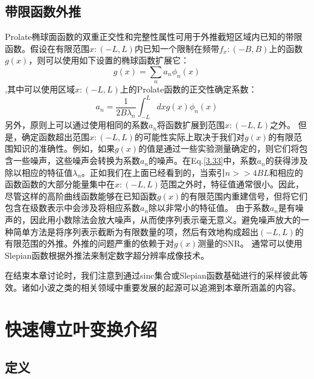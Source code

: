 \documentclass[10pt, UTF8]{ctexart}%
\newcommand{\InsertEqution}[2]{\begin{equation}
  \label{#1}
   #2
 \end{equation}}
\newcommand{\RefEq}[1]{Eq.\ref{#1}}
\newcommand{\InsertInlineEq}[1]{$#1$}
\begin{document}
\begin{sloppypar}
  \subsection{带限函数外推}
  Prolate椭球面函数的双重正交性和完整性属性可用于外推截短区域内已知的带限函数。假设在有限范围\InsertInlineEq{x:(-L,L)}内已知一个限制在频带\InsertInlineEq{f_x:(-B,B)}上的函数\InsertInlineEq{g(x)}，则可以使用如下设置的椭球函数扩展它：\InsertEqution{3.32}{g(x)=\sum_{n} a_{n} \phi_{n}(x)},其中可以使用区域\InsertInlineEq{x:(-L,L)}上的Prolate函数的正交性确定系数：\InsertEqution{3.33}{a_{n}=\frac{1}{2 B \lambda_{n}} \int_{-L}^{L} d x g(x) \phi_{n}(x)}
  另外，原则上可以通过使用相同的系数\InsertInlineEq{a_n}将函数扩展到范围\InsertInlineEq{x:(-L,L)}之外。 但是，确定函数超出范围\InsertInlineEq{x:(-L,L)}的可能性实际上取决于我们对\InsertInlineEq{g(x)}的有限范围知识的准确性。例如，如果\InsertInlineEq{g(x)}的值是通过一些实验测量确定的，则它们将包含一些噪声，这些噪声会转换为系数\InsertInlineEq{a_n}的噪声。在\RefEq{3.33}中，系数\InsertInlineEq{a_n}的获得涉及除以相应的特征值\InsertInlineEq{\lambda_n}。正如我们在上面已经看到的，当索引\InsertInlineEq{n>>4 B L}和相应的函数函数的大部分能量集中在\InsertInlineEq{x:(-L,L)}范围之外时，特征值通常很小。因此，尽管这样的高阶曲线函数能够在已知函数\InsertInlineEq{g(x)}的有限范围内重建信号，但将它们包含在级数表示中会涉及将相应系数\InsertInlineEq{a_n}除以非常小的特征值。 由于系数\InsertInlineEq{a_n}是有噪声的，因此用小数除法会放大噪声，从而使序列表示毫无意义。避免噪声放大的一种简单方法是将序列表示截断为有限数量的项，然后有效地构成超出\InsertInlineEq{(-L,L)}的有限范围的外推。外推的问题严重的依赖于对\InsertInlineEq{g(x)}测量的SNR。 通常可以使用Slepian函数根据外推法来制定数字超分辨率成像技术。

  在结束本章讨论时，我们注意到通过sinc集合或Slepian函数基础进行的采样彼此等效。诸如小波之类的相关领域中重要发展的起源可以追溯到本章所涵盖的内容。
\section{快速傅立叶变换介绍}
\subsection{定义}

  \end{sloppypar}
\end{document}

